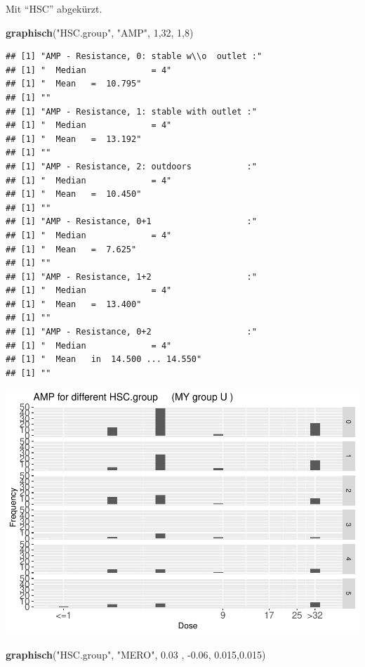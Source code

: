 \documentclass[
]{article}
\newenvironment{Shaded}{\begin{snugshade}}{\end{snugshade}}
\newcommand{\DecValTok}[1]{\textcolor[rgb]{0.00,0.00,0.81}{#1}}
\newcommand{\FloatTok}[1]{\textcolor[rgb]{0.00,0.00,0.81}{#1}}
\newcommand{\KeywordTok}[1]{\textcolor[rgb]{0.13,0.29,0.53}{\textbf{#1}}}
\newcommand{\NormalTok}[1]{#1}
\newcommand{\StringTok}[1]{\textcolor[rgb]{0.31,0.60,0.02}{#1}}
\begin{document}
Mit ``HSC'' abgekürzt.

\begin{Shaded}
\begin{Highlighting}[]
  \KeywordTok{graphisch}\NormalTok{(}\StringTok{"HSC.group"}\NormalTok{, }\StringTok{"AMP"}\NormalTok{, }\DecValTok{1}\NormalTok{,}\DecValTok{32}\NormalTok{, }\DecValTok{1}\NormalTok{,}\DecValTok{8}\NormalTok{)}
\end{Highlighting}
\end{Shaded}

\begin{verbatim}
## [1] "AMP - Resistance, 0: stable w\\o  outlet :"
## [1] "  Median             = 4"
## [1] "  Mean   =  10.795"
## [1] ""
## [1] "AMP - Resistance, 1: stable with outlet :"
## [1] "  Median             = 4"
## [1] "  Mean   =  13.192"
## [1] ""
## [1] "AMP - Resistance, 2: outdoors           :"
## [1] "  Median             = 4"
## [1] "  Mean   =  10.450"
## [1] ""
## [1] "AMP - Resistance, 0+1                   :"
## [1] "  Median             = 4"
## [1] "  Mean   =  7.625"
## [1] ""
## [1] "AMP - Resistance, 1+2                   :"
## [1] "  Median             = 4"
## [1] "  Mean   =  13.400"
## [1] ""
## [1] "AMP - Resistance, 0+2                   :"
## [1] "  Median             = 4"
## [1] "  Mean   in  14.500 ... 14.550"
## [1] ""
\end{verbatim}

\includegraphics{Verteilungen_files/figure-latex/unnamed-chunk-44-1.pdf}

\begin{Shaded}
\begin{Highlighting}[]
  \KeywordTok{graphisch}\NormalTok{(}\StringTok{"HSC.group"}\NormalTok{, }\StringTok{"MERO"}\NormalTok{, }\FloatTok{0.03}\NormalTok{ ,  }\FloatTok{-0.06}\NormalTok{,   }\FloatTok{0.015}\NormalTok{,}\FloatTok{0.015}\NormalTok{)}
\end{Highlighting}
\end{Shaded}
\end{document}
